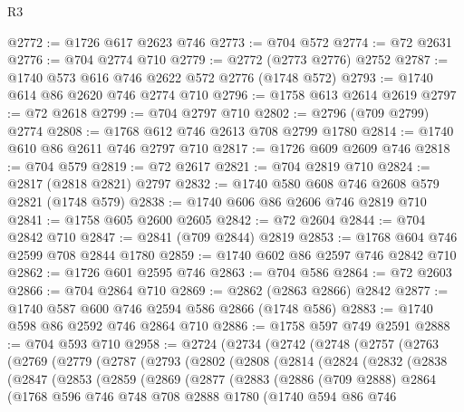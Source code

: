 \begin{lexlean}{R3}
\begin{coremodule}
@2772 := @1726 @617 @2623 @746
@2773 := @704 @572
@2774 := @72 @2631
@2776 := @704 @2774 @710
@2779 := @2772 (@2773 @2776) @2752
@2787 := @1740 @573 @616 @746 @2622 @572 @2776 (@1748 @572)
@2793 := @1740 @614 @86 @2620 @746 @2774 @710
@2796 := @1758 @613 @2614 @2619
@2797 := @72 @2618
@2799 := @704 @2797 @710
@2802 := @2796 (@709 @2799) @2774
@2808 := @1768 @612 @746 @2613 @708 @2799 @1780
@2814 := @1740 @610 @86 @2611 @746 @2797 @710
@2817 := @1726 @609 @2609 @746
@2818 := @704 @579
@2819 := @72 @2617
@2821 := @704 @2819 @710
@2824 := @2817 (@2818 @2821) @2797
@2832 := @1740 @580 @608 @746 @2608 @579 @2821 (@1748 @579)
@2838 := @1740 @606 @86 @2606 @746 @2819 @710
@2841 := @1758 @605 @2600 @2605
@2842 := @72 @2604
@2844 := @704 @2842 @710
@2847 := @2841 (@709 @2844) @2819
@2853 := @1768 @604 @746 @2599 @708 @2844 @1780
@2859 := @1740 @602 @86 @2597 @746 @2842 @710
@2862 := @1726 @601 @2595 @746
@2863 := @704 @586
@2864 := @72 @2603
@2866 := @704 @2864 @710
@2869 := @2862 (@2863 @2866) @2842
@2877 := @1740 @587 @600 @746 @2594 @586 @2866 (@1748 @586)
@2883 := @1740 @598 @86 @2592 @746 @2864 @710
@2886 := @1758 @597 @749 @2591
@2888 := @704 @593 @710
@2958 := @2724
    (@2734
      (@2742
        (@2748
          (@2757
            (@2763
              (@2769
                (@2779
                  (@2787
                    (@2793
                      (@2802
                        (@2808
                          (@2814
                            (@2824
                              (@2832
                                (@2838
                                  (@2847
                                    (@2853
                                      (@2859
                                        (@2869
                                          (@2877
                                            (@2883
                                              (@2886
                                                (@709 @2888)
                                                @2864
                                                (@1768
                                                  @596
                                                  @746
                                                  @748
                                                  @708
                                                  @2888
                                                  @1780
                                                  (@1740
                                                    @594
                                                    @86
                                                    @746

\end{coremodule}
\end{lexlean}
